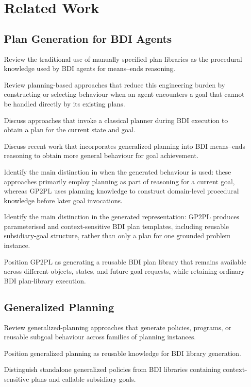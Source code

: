 \section{Related Work}

\subsection{Plan Generation for BDI Agents}

Review the traditional use of manually specified plan libraries as the
procedural knowledge used by BDI agents for means--ends reasoning.

Review planning-based approaches that reduce this engineering burden by
constructing or selecting behaviour when an agent encounters a goal that
cannot be handled directly by its existing plans.

Discuss approaches that invoke a classical planner during BDI execution
to obtain a plan for the current state and goal.

Discuss recent work that incorporates generalized planning into BDI
means--ends reasoning to obtain more general behaviour for goal
achievement.

Identify the main distinction in when the generated behaviour is used:
these approaches primarily employ planning as part of reasoning for a
current goal, whereas GP2PL uses planning knowledge to construct
domain-level procedural knowledge before later goal invocations.

Identify the main distinction in the generated representation:
GP2PL produces parameterised and context-sensitive BDI plan templates,
including reusable subsidiary-goal structure, rather than only a plan
for one grounded problem instance.

Position GP2PL as generating a reusable BDI plan library that remains
available across different objects, states, and future goal requests,
while retaining ordinary BDI plan-library execution.


\subsection{Generalized Planning}

Review generalized-planning approaches that generate policies, programs, or reusable subgoal behaviour across families of planning instances.

Position generalized planning as reusable knowledge for BDI library generation.

Distinguish standalone generalized policies from BDI libraries containing context-sensitive plans and callable subsidiary goals.


